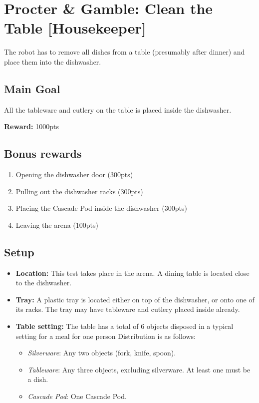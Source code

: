 \section{Procter \& Gamble: Clean the Table [Housekeeper]}
\label{test:clean-the-table}
The robot has to remove all dishes from a table (presumably after dinner) and place them into the dishwasher.


\subsection*{Main Goal}
All the tableware and cutlery on the table is placed inside the dishwasher.

\noindent\textbf{Reward:} 1000pts

\subsection*{Bonus rewards}
\begin{enumerate}[nosep]
	\item Opening the dishwasher door (300pts)
	\item Pulling out the dishwasher racks (300pts)
	\item Placing the Cascade Pod inside the dishwasher (300pts)
	\item Leaving the arena (100pts)
\end{enumerate}

\subsection*{Setup}
\begin{itemize}[nosep]
	\item \textbf{Location:} This test takes place in the arena. A dining table is located close to the dishwasher.
	\item \textbf{Tray:} A plastic tray is located either on top of the dishwasher, or onto one of its racks. The tray may have tableware and cutlery placed inside already.
	\item \textbf{Table setting:} The table has a total of 6 objects disposed in a typical setting for a meal for one person
	Distribution is as follows:
	\begin{itemize}[nosep]
		\item\textit{Silverware}: Any two objects (fork, knife, spoon).
		\item\textit{Tableware}: Any three objects, excluding silverware. At least one must be a dish.
		\item\textit{Cascade Pod}: One Cascade Pod.
	\end{itemize}
\end{itemize}


